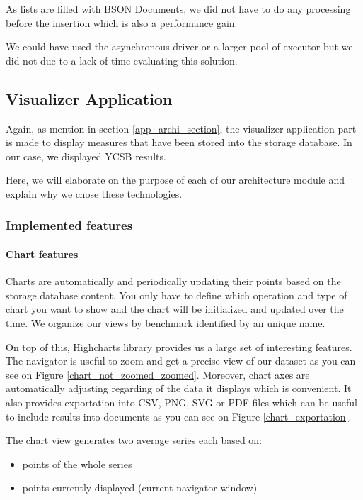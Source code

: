 \documentclass[a4paper,11pt]{report}
\begin{document}
As lists are filled with BSON Documents, we did not have to do any processing before the insertion which is also a performance gain. 

\bigskip

We could have used the asynchronous driver or a larger pool of executor but we did not due to a lack of time evaluating this solution.

\subsection{Visualizer Application}

Again, as mention in section \ref{app_archi_section}, the visualizer application part is made to display measures that have been stored into the storage database. In our case, we displayed YCSB results. 

Here, we will elaborate on the purpose of each of our architecture module and explain why we chose these technologies.

\subsubsection{Implemented features}

\paragraph{Chart features}

Charts are automatically and periodically updating their points based on the storage database content. You only have to define which operation and type of chart you want to show and the chart will be initialized and updated over the time. We organize our views by benchmark identified by an unique name.

On top of this, Highcharts library \cite{highcharts:website} provides us a large set of interesting features. 
The navigator is useful to zoom and get a precise view of our dataset as you can see on Figure \ref{chart_not_zoomed_zoomed}. 
Moreover, chart axes are automatically adjusting regarding of the data it displays which is convenient. 
It also provides exportation into CSV, PNG, SVG or PDF files which can be useful to include results into documents as you can see on Figure \ref{chart_exportation}.

The chart view generates two average series each based on:
\begin{itemize}
\item
points of the whole series
\item
points currently displayed (current navigator window)
\end{itemize}
\end{document}
